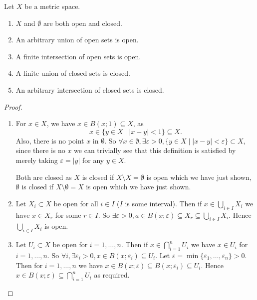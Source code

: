 \documentclass[10pt, a4paper]{article}
\begin{document}
\begin{lemma}
    Let $X$ be a metric space.

    \begin{enumerate}[label = (\alph*)]
        \item $X$ and $\emptyset$ are both open and closed.

        \item An arbitrary union of open sets is open.

        \item A finite intersection of open sets is open.

        \item A finite union of closed sets is closed.

        \item An arbitrary intersection of closed sets is closed.
    \end{enumerate}

    \begin{proof}
        \begin{enumerate}[label = (\alph*)]
            \item
            For $x \in X$,
            we have $x \in B(x; 1) \subseteq X$,
            as
            \[
            x \in \{y \in X \mid |x - y| < 1\} \subseteq X.
            \]
            Also,
            there is no point $x$ in $\emptyset$.
            So $\forall x \in \emptyset, \exists \varepsilon > 0, \{y \in X \mid |x - y| < \varepsilon\} \subset X$,
            since there is no $x$ we can trivially see that this definition is satisfied by merely taking $\varepsilon = |y|$ for any $y \in X$.

            Both are closed as $X$ is closed if $X \setminus X = \emptyset$ is open which we have just shown,
            $\emptyset$ is closed if $X \setminus \emptyset = X$ is open which we have just shown.

            \item
            Let $X_i \subset X$ be open for all $i \in I$
            ($I$ is some interval).
            Then if $x \in \bigcup_{i \in I}X_i$ we have $x \in X_{r}$ for some $r \in I$.
            So $\exists \varepsilon > 0, a \in B(x; \varepsilon) \subseteq X_{r} \subseteq \bigcup_{i \in I}X_i$.
            Hence $\bigcup_{i \in I}X_i$ is open.

            \item
            Let $U_i \subset X$ be open for $i = 1, \dotsc, n$.
            Then if $x \in \bigcap_{i = 1}^{n}U_i$ we have $x \in U_i$ for $i = 1, \dotsc, n$.
            So $\forall i, \exists \varepsilon_i > 0, x \in B(x; \varepsilon_i) \subseteq U_i$.
            Let $\varepsilon = \min\{\varepsilon_1, \dotsc, \varepsilon_n\} > 0$.
            Then for $i = 1, \dotsc, n$ we have $x \in B(x; \varepsilon) \subseteq B(x; \varepsilon_i) \subseteq U_i$.
            Hence $x \in B(x; \varepsilon) \subseteq \bigcap_{i = 1}^{n}U_i$ as required.


\end{enumerate}
\end{proof}
\end{lemma}
\end{document}
